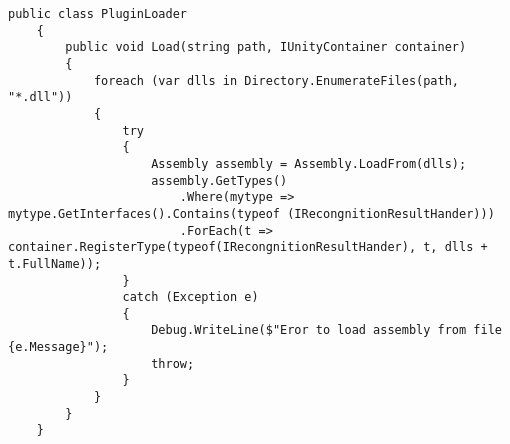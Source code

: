 \begin{lstlisting}[style=fsharpstyle,caption={Загрузчик плагинов}, label=lst:plugin_loader]
 public class PluginLoader
    {
        public void Load(string path, IUnityContainer container)
        {
            foreach (var dlls in Directory.EnumerateFiles(path, "*.dll"))
            {
                try
                {
                    Assembly assembly = Assembly.LoadFrom(dlls);
                    assembly.GetTypes()
                        .Where(mytype => mytype.GetInterfaces().Contains(typeof (IRecongnitionResultHander)))
                        .ForEach(t => container.RegisterType(typeof(IRecongnitionResultHander), t, dlls + t.FullName));
                }
                catch (Exception e)
                {
                    Debug.WriteLine($"Eror to load assembly from file {e.Message}");
                    throw;
                }
            }
        }
    }
\end{lstlisting}
